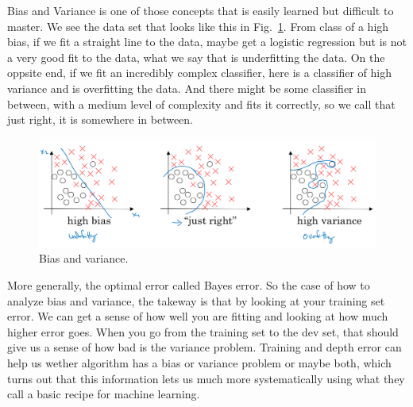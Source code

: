 \documentclass[a4paper]{article}
\begin{document}
Bias and Variance is one of those concepts that is easily learned but difficult to master. We see the data set that looks like this in Fig.~\ref{p7}. From class of a high bias, if we fit a straight line to the data, maybe get a logistic regression but is not a very good fit to the data, what we say that is underfitting the data. On the oppsite end, if we fit an incredibly complex classifier, here is a classifier of high variance and is overfitting the data. And there might be some classifier in between, with a medium level of complexity and fits it correctly, so we call that just right, it is somewhere in between.
\begin{figure}
	\begin{center}
		\includegraphics[scale=0.3]{figures/8.png}
	\end{center}
	\caption{Bias and variance.}
	\label{p7}
\end{figure}

More generally, the optimal error called Bayes error. So the case of how to analyze bias and variance, the takeway is that by looking at your training set error. We can get a sense of how well you are fitting and looking at how much higher error goes. When you go from the training set to the dev set, that should give us a sense of how bad is the variance problem. Training and depth error can help us wether algorithm has a bias or variance problem or maybe both, which turns out that this information lets us much more systematically using what they call a basic recipe for machine learning.
\end{document}
